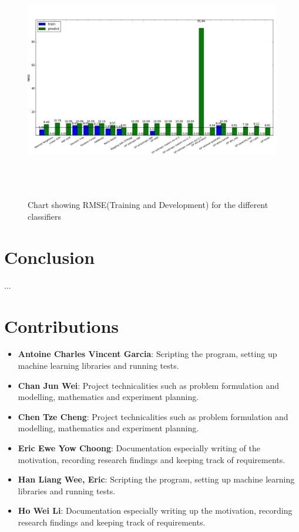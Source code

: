\documentclass{article}
\begin{document}
	\begin{figure}
	\includegraphics[height=105mm, keepaspectratio]{results}
	\caption{Chart showing RMSE(Training and Development) for the different classifiers}
	\label{rmse_results_chart}
	\end{figure}

	\newpage
	\section{Conclusion}	
	... \\

	\section{Contributions}
	\begin{itemize}
		\item \textbf{Antoine Charles Vincent Garcia}: 
		Scripting the program, setting up machine learning libraries and running tests.
		\item \textbf{Chan Jun Wei}: 
		Project technicalities such as problem formulation and modelling, mathematics and experiment planning.
		\item \textbf{Chen Tze Cheng}: 
		Project technicalities such as problem formulation and modelling, mathematics and experiment planning.
		\item \textbf{Eric Ewe Yow Choong}: 
		Documentation especially writing of the motivation, recording research findings and keeping track of requirements.
		\item \textbf{Han Liang Wee, Eric}: 
		Scripting the program, setting up machine learning libraries and running tests.
		\item \textbf{Ho Wei Li}: 
		Documentation especially writing up the motivation, recording research findings and keeping track of requirements.
	\end{itemize}
	
	
	
\end{document}
